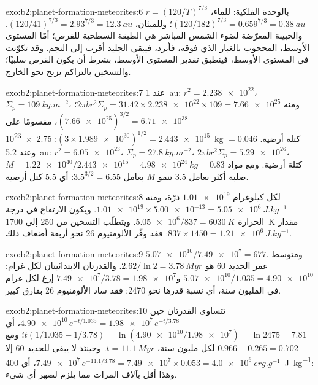 \begin{solution}{exo:b2:planet-formation-meteorites:6}
$r = (120/T)^{7/3}$ بالوحدة الفلكية: للماء، $(120/182)^{7/3} = 0.659^{7/3} =
\qty{0.38}{au}$؛ وللميثان، $(120/41)^{7/3} = 2.93^{7/3} = \qty{12.3}{au}$.
والحبيبة المعرّضة لضوء الشمس المباشر هي الطبقة السطحية للقرص؛ أمّا المستوى الأوسط،
المحجوب بالغبار الذي فوقه، فأبرد، فيبقى الجليد أقرب إلى النجم. وقد تكوّنت
 في المستوى الأوسط، فينطبق تقدير المستوى الأوسط، بشرط أن يكون
القرص سلبيًا؛ والتسخين بالتراكم يزيح  نحو الخارج.
\end{solution}

\begin{solution}{exo:b2:planet-formation-meteorites:7}
عند \qty{1}{au}: $r^2 = \num{2.238e22}$، $\Sigma_p = \qty{109}{kg.m^{-2}}$، ومنه
$2\pi b r^2\Sigma_p = 31.42\times\num{2.238e22}\times109 = \num{7.66e25}$؛
$(\num{7.66e25})^{3/2} = \num{6.71e38}$، مقسومًا على
$(3\times\num{1.989e30})^{1/2} = \num{2.443e15}$: \qty{2.75e23}{kg}
$= 0.046$ كتلة أرضية. وعند \qty{5.2}{au}: $r^2 = \num{6.05e23}$،
$\Sigma_p = \qty{27.8}{kg.m^{-2}}$، $2\pi b r^2\Sigma_p = \num{5.29e26}$،
$M = \num{1.22e40}/\num{2.443e15} = \qty{4.98e24}{kg} = 0.83$ كتلة أرضية.
ومع مواد صلبة أكثر بعامل \num{3.5} تنمو $M$ بعامل $3.5^{3/2} = 6.55$: أي 5.5 كتل
أرضية.
\end{solution}

\begin{solution}{exo:b2:planet-formation-meteorites:8}
لكل كيلوغرام $\num{1.01e19}$ ذرّة، ومنه
$\num{1.01e19}\times\num{5.00e-13} = \qty{5.05e6}{J.kg^{-1}}$. ويكون الارتفاع في درجة
الحرارة $\num{5.05e6}/837 = \qty{6030}{K}$. ويتطلّب التسخين من \num{250} إلى
\qty{1700}{K} مقدار $837\times1450 = \qty{1.21e6}{J.kg^{-1}}$: فقد وفّر الألومنيوم 26
نحو أربعة أضعاف ذلك.
\end{solution}

\begin{solution}{exo:b2:planet-formation-meteorites:9}
$\num{5.07e10}/\num{7.49e7} = 677$. ومتوسط عمر الحديد 60 هو
$2.62/\ln2 = \qty{3.78}{Myr}$. والقدرتان الابتدائيتان لكل غرام:
$\num{5.07e10}/1.035 = \num{4.90e10}$ و$\num{7.49e7}/3.78 = \num{1.98e7}$ إرغ لكل
غرام في المليون سنة، أي نسبة قدرها نحو \num{2470}: فقد ساد الألومنيوم 26 بفارق كبير.
\end{solution}

\begin{solution}{exo:b2:planet-formation-meteorites:10}
تتساوى القدرتان حين $\num{4.90e10}\,e^{-t/1.035} = \num{1.98e7}\,e^{-t/3.78}$،
أي $t(1/1.035 - 1/3.78) = \ln(\num{4.90e10}/\num{1.98e7}) = \ln 2475 = 7.81$؛
ومع $0.966 - 0.265 = 0.702$ لكل مليون سنة، $t = \qty{11.1}{Myr}$. وحينئذ
لا يبقى للحديد 60 إلا $\num{7.49e7}\,e^{-11.1/3.78} = \num{7.49e7}\times0.053 =
\qty{4.0e6}{erg.g^{-1}}$، أي \qty{400}{J.kg^{-1}}: وهذا أقل بآلاف المرات مما
يلزم لصهر أي شيء.
\end{solution}

